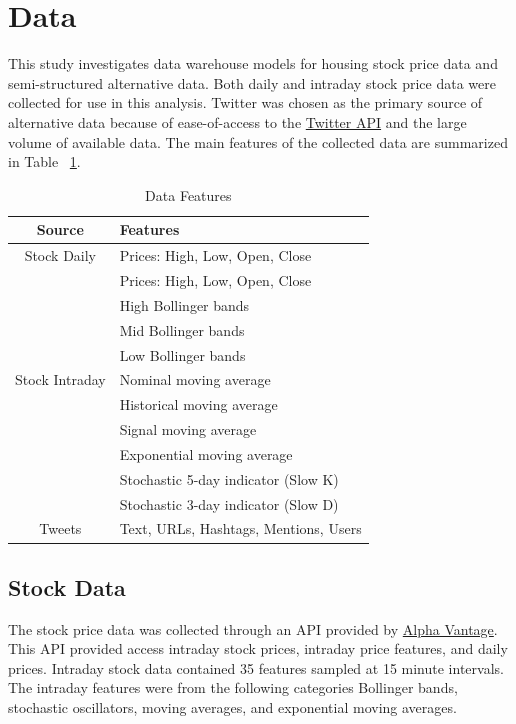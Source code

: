 \documentclass[journal]{IEEEtran}
\begin{document}
\section{Data}

This study investigates data warehouse models for housing stock
 price data and semi-structured alternative data. 
Both daily and intraday stock price data were collected
 for use in this analysis. 
Twitter was chosen as the primary source of alternative data because of
 ease-of-access to the \href{https://developer.twitter.com/en/docs}{Twitter API} 
 and the large volume of available data.
The main features of the collected data are summarized in Table ~\ref{DataFeatures}.

\begin{table}
	\renewcommand{\arraystretch}{1.3}
	\caption{Data Features}
	\label{DataFeatures}
	\centering
	\begin{tabular}{c|l}
		\hline
		Source       & Features\\
		\hline
		\hline
		Stock Daily  & Prices: High, Low, Open, Close\\
		\hline
		\multirow{9}{*}{Stock Intraday} &  Prices: High, Low, Open, Close \\
		&  High Bollinger bands\\
		&  Mid Bollinger bands\\
		&  Low Bollinger bands\\ 
		&  Nominal moving average\\
		&  Historical moving average\\
		&  Signal moving average\\ 
		&  Exponential moving average\\
		&  Stochastic 5-day indicator (Slow K)\\
		&  Stochastic 3-day indicator (Slow D)\\
		\hline
		Tweets       & Text, URLs, Hashtags, Mentions, Users\\
		\hline
	\end{tabular}
\end{table}

\subsection{Stock Data}

The stock price data was collected through an API provided by
 \href{https://www.alphavantage.co/}{Alpha Vantage}.
This API provided access intraday stock prices, intraday price
 features, and daily prices.
Intraday stock data contained 35 features sampled at 15 minute intervals. 
The intraday features were from the following categories Bollinger bands, 
 stochastic oscillators, moving averages, and exponential moving averages.
\end{document}
